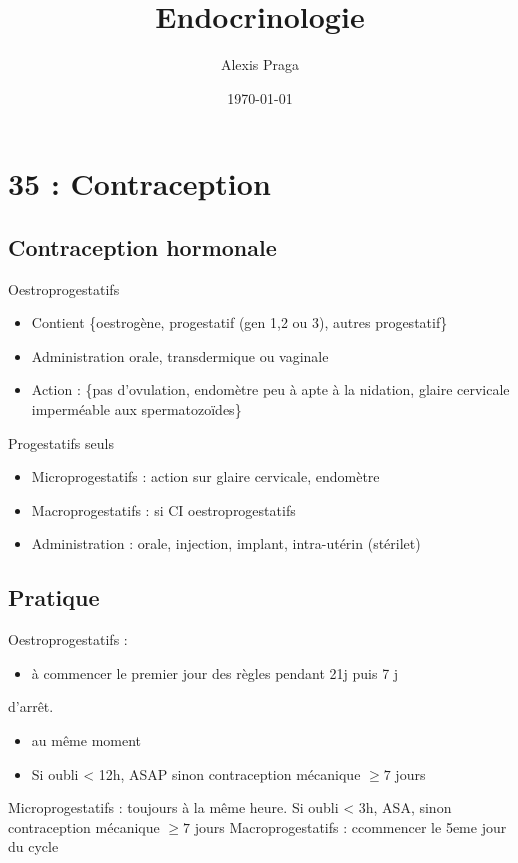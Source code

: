 \documentclass[11pt]{article}
\author{Alexis Praga}
\date{\today}
\title{Endocrinologie}
\begin{document}
\maketitle
\tableofcontents



\section{35 : Contraception}
\label{sec:org6da8bce}
\subsection{Contraception hormonale}
\label{sec:orgbcc1148}
Oestroprogestatifs
\begin{itemize}
\item Contient \{oestrogène, progestatif (gen 1,2 ou 3), autres progestatif\}
\item Administration orale, transdermique ou vaginale
\item Action : \{pas d'ovulation, endomètre peu à apte à la nidation, glaire
cervicale imperméable aux spermatozoïdes\}
\end{itemize}
Progestatifs seuls 
\begin{itemize}
\item Microprogestatifs : action sur glaire cervicale, endomètre
\item Macroprogestatifs : si CI oestroprogestatifs
\item Administration : orale, injection, implant, intra-utérin (stérilet)
\end{itemize}
\subsection{Pratique}
\label{sec:org2b3c81e}
Oestroprogestatifs : 
\begin{itemize}
\item à commencer le premier jour des règles pendant 21j puis 7 j
\end{itemize}
d'arrêt.
\begin{itemize}
\item au même moment
\item Si oubli < 12h, ASAP sinon contraception mécanique \(\ge 7\) jours
\end{itemize}
Microprogestatifs : toujours à la même heure. Si oubli < 3h, ASA, sinon
contraception mécanique \(\ge 7\) jours
Macroprogestatifs : ccommencer le 5eme jour du cycle
\end{document}

